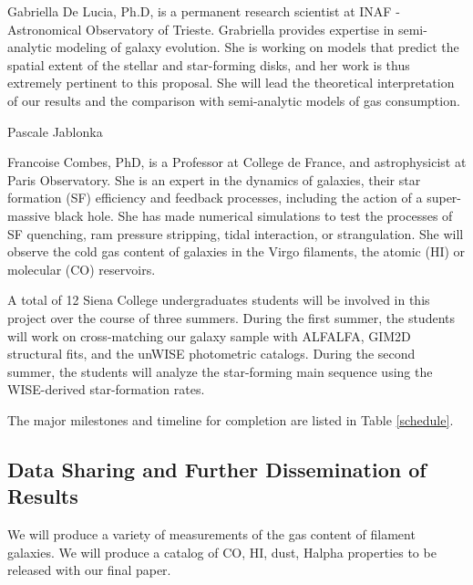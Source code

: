 \documentclass[12pt, preprint]{aastex}
\begin{document}
{Gabriella De Lucia, Ph.D, is a permanent research scientist at INAF -
Astronomical Observatory of Trieste.  Grabriella provides expertise in
semi-analytic modeling of galaxy evolution. She is working on models
that predict the spatial extent of the stellar and star-forming disks,
and her work is thus extremely pertinent to this proposal.  She will lead
the theoretical interpretation of our results and the comparison
with semi-analytic models of gas consumption.

Pascale Jablonka


Francoise Combes, PhD, is a Professor at College de France, and astrophysicist at Paris Observatory. She is an expert in the dynamics of galaxies, their star formation (SF) efficiency and feedback processes, including the action of a super-massive black hole. She has made numerical simulations to test the processes of SF quenching, ram pressure stripping, tidal interaction, or strangulation. She will observe the cold gas content of galaxies in the Virgo filaments, the atomic (HI) or molecular (CO) reservoirs.

A total of 12 Siena College undergraduates students will be involved
in this project over the course of three summers.  During the first
summer, the students will work on cross-matching our galaxy sample
with ALFALFA, GIM2D structural fits, and the unWISE photometric catalogs.  During the second summer, the
students will analyze the star-forming main sequence using the
WISE-derived star-formation rates.

The major milestones and timeline for completion
are listed in Table \ref{schedule}. 


\vspace*{-.8cm}\subsection{Data Sharing and Further Dissemination of Results }
\vspace*{-.3cm}
We will produce a variety of measurements of the gas content of
filament galaxies.  We will produce a catalog of CO, HI, dust, Halpha
properties to be released with our final paper.

}
\end{document}
